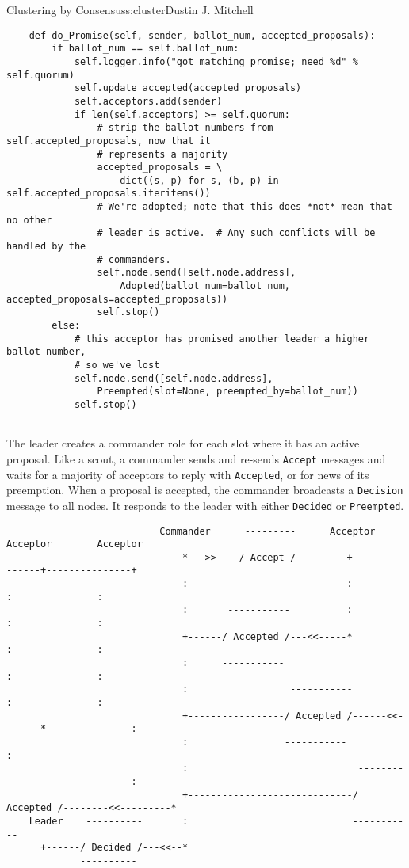 \begin{aosachapter}{Clustering by Consensus}{s:cluster}{Dustin J. Mitchell}
\begin{verbatim}
    def do_Promise(self, sender, ballot_num, accepted_proposals):
        if ballot_num == self.ballot_num:
            self.logger.info("got matching promise; need %d" % self.quorum)
            self.update_accepted(accepted_proposals)
            self.acceptors.add(sender)
            if len(self.acceptors) >= self.quorum:
                # strip the ballot numbers from self.accepted_proposals, now that it
                # represents a majority
                accepted_proposals = \ 
                    dict((s, p) for s, (b, p) in self.accepted_proposals.iteritems())
                # We're adopted; note that this does *not* mean that no other
                # leader is active.  # Any such conflicts will be handled by the
                # commanders.
                self.node.send([self.node.address],
                    Adopted(ballot_num=ballot_num, accepted_proposals=accepted_proposals))
                self.stop()
        else:
            # this acceptor has promised another leader a higher ballot number,
            # so we've lost
            self.node.send([self.node.address], 
                Preempted(slot=None, preempted_by=ballot_num))
            self.stop()
    
\end{verbatim}

The leader creates a commander role for each slot where it has an active
proposal. Like a scout, a commander sends and re-sends \texttt{Accept}
messages and waits for a majority of acceptors to reply with
\texttt{Accepted}, or for news of its preemption. When a proposal is
accepted, the commander broadcasts a \texttt{Decision} message to all
nodes. It responds to the leader with either \texttt{Decided} or
\texttt{Preempted}.

\begin{verbatim}
                           Commander      ---------      Acceptor        Acceptor        Acceptor
                               *--->>----/ Accept /---------+---------------+---------------+
                               :         ---------          :               :               :
                               :       -----------          :               :               :
                               +------/ Accepted /---<<-----*               :               :
                               :      -----------                           :               :
                               :                  -----------               :               :
                               +-----------------/ Accepted /------<<-------*               :
                               :                 -----------                                :
                               :                              -----------                   :
                               +-----------------------------/ Accepted /--------<<---------*
    Leader    ----------       :                             -----------
      +------/ Decided /---<<--*
             ----------   
\end{verbatim}


\end{aosachapter}
